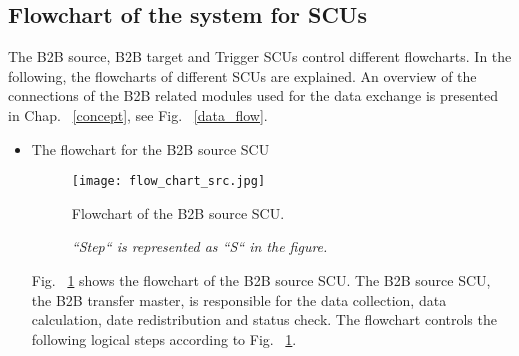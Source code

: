 \subsection{Flowchart of the system for SCUs}
\label{sec_firmware}
The B2B source, B2B target and Trigger SCUs control different flowcharts. In the following, the flowcharts of different SCUs are explained. An overview of the connections of the B2B related modules used for the data exchange is presented in Chap. ~\ref{concept}, see Fig. ~\ref{data_flow}.
\begin{itemize}
\item The flowchart for the B2B source SCU
\begin{figure}[!htb]
   \centering   
   \texttt{[image: flow\_chart\_src.jpg]}
   \caption{Flowchart of the B2B source SCU.}
   \caption*{\textsl{\small{``Step`` is represented as ``S`` in the figure.  }}}
   \label{flow_chart_src}
\end{figure}

Fig. ~\ref{flow_chart_src} shows the flowchart of the B2B source SCU. The B2B source SCU, the B2B transfer master, is responsible for the data collection, data calculation, date redistribution and status check. The flowchart controls the following logical steps according to Fig. ~\ref{flow_chart_src}.


\end{itemize}
